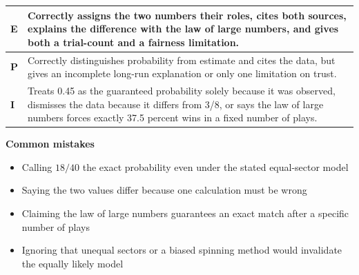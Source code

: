 \documentclass[11pt]{article}
\begin{document}
{\small\renewcommand{\arraystretch}{1.25}
\noindent\begin{tabular}{|p{0.5in}|p{5.9in}|}
\hline
\textbf{E} & Correctly assigns the two numbers their roles, cites both sources, explains the difference with the law of large numbers, and gives both a trial-count and a fairness limitation. \\ \hline
\textbf{P} & Correctly distinguishes probability from estimate and cites the data, but gives an incomplete long-run explanation or only one limitation on trust. \\ \hline
\textbf{I} & Treats 0.45 as the guaranteed probability solely because it was observed, dismisses the data because it differs from 3/8, or says the law of large numbers forces exactly 37.5 percent wins in a fixed number of plays. \\ \hline
\end{tabular}}

\textbf{Common mistakes}
\begin{itemize}[leftmargin=1.5em,itemsep=2pt,topsep=2pt]
  \item Calling $18/40$ the exact probability even under the stated equal-sector model
  \item Saying the two values differ because one calculation must be wrong
  \item Claiming the law of large numbers guarantees an exact match after a specific number of plays
  \item Ignoring that unequal sectors or a biased spinning method would invalidate the equally likely model
\end{itemize}

\clearpage
{}
\end{document}
